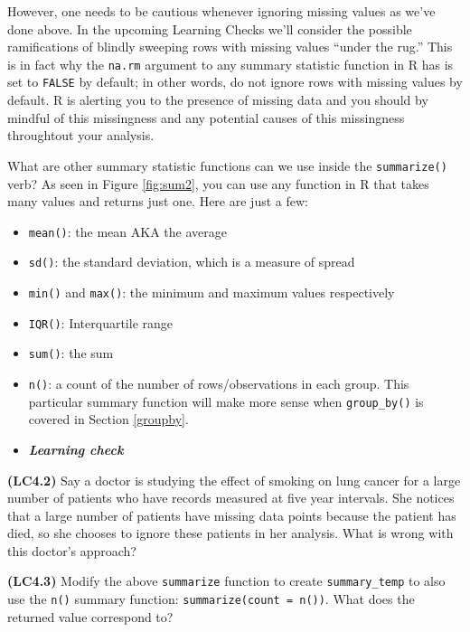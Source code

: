 \documentclass[12pt, krantz2,]{krantz}
\providecommand{\tightlist}{%
  \setlength{\itemsep}{0pt}\setlength{\parskip}{0pt}}
\newenvironment{rmdblock}[1]
  {\begin{shaded*}
  \begin{itemize}
  \renewcommand{\labelitemi}{
    \raisebox{-.7\height}[0pt][0pt]{
    }
  }
  \item
  }
  {
  \end{itemize}
  \end{shaded*}
  }
\newenvironment{learncheck}
  {\begin{rmdblock}{warning}}
  {\end{rmdblock}}
\begin{document}
However, one needs to be cautious whenever ignoring missing values as we've done above. In the upcoming Learning Checks we'll consider the possible ramifications of blindly sweeping rows with missing values ``under the rug.'' This is in fact why the \texttt{na.rm} argument to any summary statistic function in R has is set to \texttt{FALSE} by default; in other words, do not ignore rows with missing values by default. R is alerting you to the presence of missing data and you should by mindful of this missingness and any potential causes of this missingness throughtout your analysis.

What are other summary statistic functions can we use inside the \texttt{summarize()} verb? As seen in Figure \ref{fig:sum2}, you can use any function in R that takes many values and returns just one. Here are just a few:

\begin{itemize}
\tightlist
\item
  \texttt{mean()}: the mean AKA the average
\item
  \texttt{sd()}: the standard deviation, which is a measure of spread
\item
  \texttt{min()} and \texttt{max()}: the minimum and maximum values respectively
\item
  \texttt{IQR()}: Interquartile range
\item
  \texttt{sum()}: the sum
\item
  \texttt{n()}: a count of the number of rows/observations in each group. This particular summary function will make more sense when \texttt{group\_by()} is covered in Section \ref{groupby}.
\end{itemize}

\begin{learncheck}
\textbf{\emph{Learning check}}
\end{learncheck}

\textbf{(LC4.2)} Say a doctor is studying the effect of smoking on lung cancer for a large number of patients who have records measured at five year intervals. She notices that a large number of patients have missing data points because the patient has died, so she chooses to ignore these patients in her analysis. What is wrong with this doctor's approach?

\textbf{(LC4.3)} Modify the above \texttt{summarize} function to create \texttt{summary\_temp} to also use the \texttt{n()} summary function: \texttt{summarize(count\ =\ n())}. What does the returned value correspond to?
\end{document}
